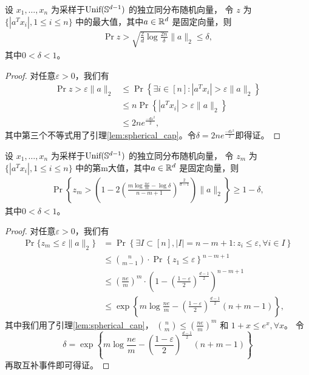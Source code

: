 \documentclass[main]{subfiles}
\begin{document}
\begin{lemma} \label{lem:projbound_upper}
  设 $x_1, \ldots, x_n $ 为采样于$\text{Unif}(\S^{d-1})$ 的独立同分布随机向量，
  令 $z$ 为 $\{ |a^T x_i|, 1 \le i \le n\}$
  中的最大值，其中$a \in \R^d $ 是固定向量，则
  \begin{align*}
    \Pr{z>\sqrt{\frac{2}{d} \log \frac{2n}{\delta}} \|a\|_2} \le \delta,
  \end{align*}
  其中$0<\delta<1$。
\end{lemma}

\begin{proof}
  对任意$\varepsilon>0$，我们有
  \begin{align*}
    \Pr{z > \varepsilon \|a\|_2} &\le \Pr\left\{\exists i \in [n] : |a^T
    x_i|>\varepsilon \|a\|_2 \right\} \\
    &\le n \Pr\left\{ |a^T x_i|>\varepsilon \|a\|_2\right\} \\
    &\le 2n e^{\frac{-d\varepsilon^2}{2}},
  \end{align*}
  其中第三个不等式用了引理\ref{lem:spherical_cap}。令$\delta=2n
  e^{\frac{-d\varepsilon^2}{2}}$即得证。
\end{proof}

\begin{lemma} \label{lem:projbound_lower}
  设 $x_1, \ldots, x_n $ 为采样于$\text{Unif}(\S^{d-1})$ 的独立同分布随机向量，
  令 $z_m$ 为 $\{ |a^T x_i|, 1 \le i \le n\}$ 中的第m大值，其中$a \in \R^d $ 是固定向量，则
  \begin{align*}
    \Pr\left\{z_m>\left( 1-2\left(\frac{m\log \frac{ne}{m}-\log \delta}{n-m+1}
    \right)^{\frac{2}{d-1}}\right) \|a\|_2\right\} \ge 1-\delta,
  \end{align*}
  其中$0<\delta<1$。
\end{lemma}
\begin{proof}
  对任意$\varepsilon>0$，我们有
  \begin{align*}
    \Pr\{z_m \le \varepsilon \|a\|_2\} &= \Pr\left\{\exists I \subset [n], |I|=n-m+1:
    z_i \le \varepsilon, \forall i \in I\right\} \\
    &\le \binom{n}{m-1} \cdot \Pr \left\{ z_1 \le \varepsilon \right\}^{n-m+1}\\
    &\le \left( \frac{ne}{m} \right)^m \cdot \left( 1-\left(
    \frac{1-\varepsilon}{2} \right)^{\frac{d-1}{2}} \right)^{n-m+1} \\
    &\le \exp \left\{ m \log \frac{ne}{m}-\left(
    \frac{1-\varepsilon}{2}\right)^{\frac{d-1}{2}} (n+m-1) \right\},
  \end{align*}
  其中我们用了引理\ref{lem:spherical_cap}， $\binom{n}{m}\le
  (\frac{ne}{m})^m$ 和 $1+x\le e^x, \forall x$。
  令
  $$\delta= \exp \left\{ m \log \frac{ne}{m}-\left(
    \frac{1-\varepsilon}{2}\right)^{\frac{d-1}{2}} (n+m-1)
  \right\}$$
  再取互补事件即可得证。
\end{proof}
\end{document}
